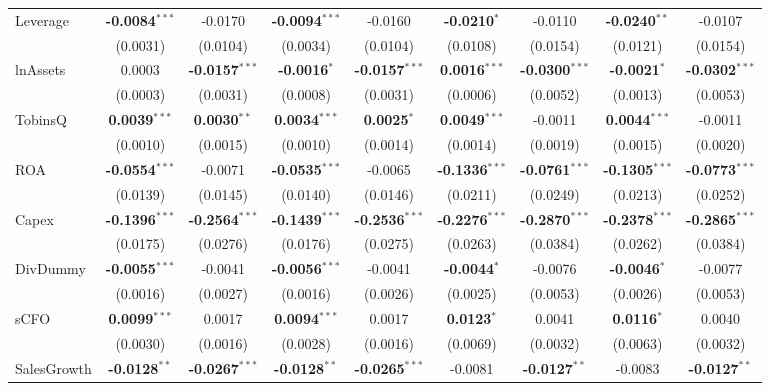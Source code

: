 \begin{landscape}
\begin{table}[H]
\begin{tabular}{lcccccccc}
\midrule
Leverage & \textbf{-0.0084}$^{***}$ & -0.0170 & \textbf{-0.0094}$^{***}$ & -0.0160 & \textbf{-0.0210}$^{*}$ & -0.0110 & \textbf{-0.0240}$^{**}$ & -0.0107 \\
 & (0.0031) & (0.0104) & (0.0034) & (0.0104) & (0.0108) & (0.0154) & (0.0121) & (0.0154) \\
lnAssets & 0.0003 & \textbf{-0.0157}$^{***}$ & \textbf{-0.0016}$^{*}$ & \textbf{-0.0157}$^{***}$ & \textbf{0.0016}$^{***}$ & \textbf{-0.0300}$^{***}$ & \textbf{-0.0021}$^{*}$ & \textbf{-0.0302}$^{***}$ \\
 & (0.0003) & (0.0031) & (0.0008) & (0.0031) & (0.0006) & (0.0052) & (0.0013) & (0.0053) \\
TobinsQ & \textbf{0.0039}$^{***}$ & \textbf{0.0030}$^{**}$ & \textbf{0.0034}$^{***}$ & \textbf{0.0025}$^{*}$ & \textbf{0.0049}$^{***}$ & -0.0011 & \textbf{0.0044}$^{***}$ & -0.0011 \\
 & (0.0010) & (0.0015) & (0.0010) & (0.0014) & (0.0014) & (0.0019) & (0.0015) & (0.0020) \\
ROA & \textbf{-0.0554}$^{***}$ & -0.0071 & \textbf{-0.0535}$^{***}$ & -0.0065 & \textbf{-0.1336}$^{***}$ & \textbf{-0.0761}$^{***}$ & \textbf{-0.1305}$^{***}$ & \textbf{-0.0773}$^{***}$ \\
 & (0.0139) & (0.0145) & (0.0140) & (0.0146) & (0.0211) & (0.0249) & (0.0213) & (0.0252) \\
Capex & \textbf{-0.1396}$^{***}$ & \textbf{-0.2564}$^{***}$ & \textbf{-0.1439}$^{***}$ & \textbf{-0.2536}$^{***}$ & \textbf{-0.2276}$^{***}$ & \textbf{-0.2870}$^{***}$ & \textbf{-0.2378}$^{***}$ & \textbf{-0.2865}$^{***}$ \\
 & (0.0175) & (0.0276) & (0.0176) & (0.0275) & (0.0263) & (0.0384) & (0.0262) & (0.0384) \\
DivDummy & \textbf{-0.0055}$^{***}$ & -0.0041 & \textbf{-0.0056}$^{***}$ & -0.0041 & \textbf{-0.0044}$^{*}$ & -0.0076 & \textbf{-0.0046}$^{*}$ & -0.0077 \\
 & (0.0016) & (0.0027) & (0.0016) & (0.0026) & (0.0025) & (0.0053) & (0.0026) & (0.0053) \\
sCFO & \textbf{0.0099}$^{***}$ & 0.0017 & \textbf{0.0094}$^{***}$ & 0.0017 & \textbf{0.0123}$^{*}$ & 0.0041 & \textbf{0.0116}$^{*}$ & 0.0040 \\
 & (0.0030) & (0.0016) & (0.0028) & (0.0016) & (0.0069) & (0.0032) & (0.0063) & (0.0032) \\
SalesGrowth & \textbf{-0.0128}$^{**}$ & \textbf{-0.0267}$^{***}$ & \textbf{-0.0128}$^{**}$ & \textbf{-0.0265}$^{***}$ & -0.0081 & \textbf{-0.0127}$^{**}$ & -0.0083 & \textbf{-0.0127}$^{**}$ \\

\end{tabular}
\end{table}
\end{landscape}
